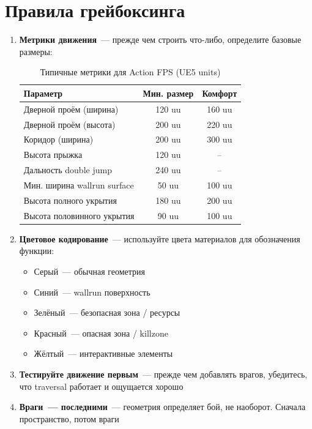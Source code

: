 \documentclass[a4paper,11pt]{report}
\begin{document}
\section{Правила грейбоксинга}

\begin{enumerate}[leftmargin=*]
  \item \textbf{Метрики движения}~--- прежде чем строить что-либо,
    определите базовые размеры:

\begin{table}[H]
\centering
\caption{Типичные метрики для Action FPS (UE5 units)}
\begin{tabular}{@{}lcc@{}}
\toprule
\textbf{Параметр} & \textbf{Мин. размер} & \textbf{Комфорт} \\
\midrule
Дверной проём (ширина) & 120 uu & 160 uu \\
Дверной проём (высота) & 200 uu & 220 uu \\
Коридор (ширина) & 200 uu & 300 uu \\
Высота прыжка & 120 uu & -- \\
Дальность double jump & 240 uu & -- \\
Мин. ширина wallrun surface & 50 uu & 100 uu \\
Высота полного укрытия & 180 uu & 200 uu \\
Высота половинного укрытия & 90 uu & 100 uu \\
\bottomrule
\end{tabular}
\end{table}

  \item \textbf{Цветовое кодирование}~--- используйте цвета материалов
    для обозначения функции:
    \begin{itemize}
      \item Серый~--- обычная геометрия
      \item Синий~--- wallrun поверхность
      \item Зелёный~--- безопасная зона / ресурсы
      \item Красный~--- опасная зона / killzone
      \item Жёлтый~--- интерактивные элементы
    \end{itemize}

  \item \textbf{Тестируйте движение первым}~--- прежде чем добавлять
    врагов, убедитесь, что traversal работает и ощущается хорошо

  \item \textbf{Враги~--- последними}~--- геометрия определяет бой,
    не наоборот. Сначала пространство, потом враги
\end{enumerate}
\end{document}
